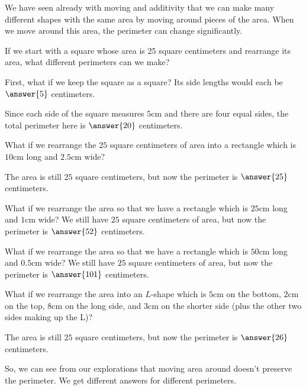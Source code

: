\documentclass{ximera}
\begin{document}
We have seen already with moving and additivity that we can make many different shapes with the same area by moving around pieces of the area. When we move around this area, the perimeter can change significantly.
\begin{question}
If we start with a square whose area is $25$ square centimeters and rearrange its area, what different perimeters can we make?

First, what if we keep the square as a square? Its side lengths would each be $\answer{5}$ centimeters.
\begin{image}
\end{image}
Since each side of the square measures $5$cm and there are four equal sides, the total perimeter here is $\answer{20}$ centimeters.

What if we rearrange the $25$ square centimeters of area into a rectangle which is $10$cm long and $2.5$cm wide?
\begin{image}
\end{image}
The area is still $25$ square centimeters, but now the perimeter is $\answer{25}$ centimeters.

What if we rearrange the area so that we have a rectangle which is $25$cm long and $1$cm wide? We still have $25$ square centimeters of area, but now the perimeter is $\answer{52}$ centimeters.

What if we rearrange the area so that we have a rectangle which is $50$cm long and $0.5$cm wide? We still have $25$ square centimeters of area, but now the perimeter is $\answer{101}$ centimeters.

What if we rearrange the area into an $L$-shape which is $5$cm on the bottom, $2$cm on the top, $8$cm on the long side, and $3$cm on the shorter side (plus the other two sides making up the L)?
\begin{image}
\end{image}
The area is still $25$ square centimeters, but now the perimeter is $\answer{26}$ centimeters.
\end{question}
So, we can see from our explorations that moving area around doesn't preserve the perimeter. We get different answers for different perimeters.
\end{document}
